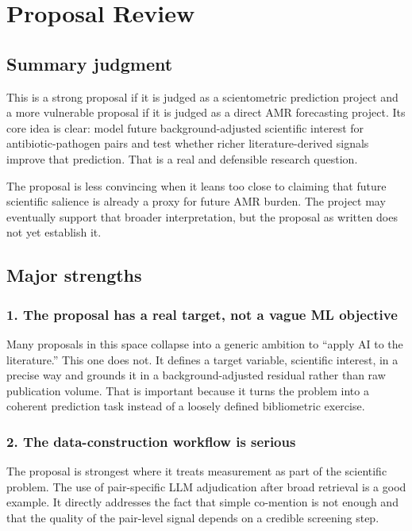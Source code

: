 \section{Proposal Review}\label{proposal-review}

\subsection{Summary judgment}\label{summary-judgment}

This is a strong proposal if it is judged as a scientometric prediction
project and a more vulnerable proposal if it is judged as a direct AMR
forecasting project. Its core idea is clear: model future
background-adjusted scientific interest for antibiotic-pathogen pairs
and test whether richer literature-derived signals improve that
prediction. That is a real and defensible research question.

The proposal is less convincing when it leans too close to claiming that
future scientific salience is already a proxy for future AMR burden. The
project may eventually support that broader interpretation, but the
proposal as written does not yet establish it.

\subsection{Major strengths}\label{major-strengths}

\subsubsection{1. The proposal has a real target, not a vague ML
objective}\label{the-proposal-has-a-real-target-not-a-vague-ml-objective}

Many proposals in this space collapse into a generic ambition to ``apply
AI to the literature.'' This one does not. It defines a target variable,
scientific interest, in a precise way and grounds it in a
background-adjusted residual rather than raw publication volume. That is
important because it turns the problem into a coherent prediction task
instead of a loosely defined bibliometric exercise.

\subsubsection{2. The data-construction workflow is
serious}\label{the-data-construction-workflow-is-serious}

The proposal is strongest where it treats measurement as part of the
scientific problem. The use of pair-specific LLM adjudication after
broad retrieval is a good example. It directly addresses the fact that
simple co-mention is not enough and that the quality of the pair-level
signal depends on a credible screening step.

